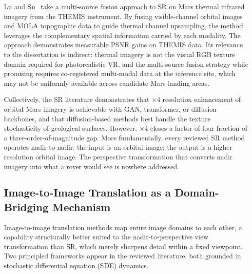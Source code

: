\documentclass[10pt,journal]{IEEEtran}
\begin{document}
Lu and Su~\cite{lu2025thermal} take a multi-source fusion approach to SR on Mars
thermal infrared imagery from the THEMIS instrument. By fusing visible-channel
orbital images and MOLA topographic data to guide thermal channel upsampling,
the method leverages the complementary spatial information carried by each
modality. The approach demonstrates measurable PSNR gains on THEMIS data.
Its relevance to the dissertation is indirect: thermal imagery is not the visual
RGB texture domain required for photorealistic VR, and the multi-source fusion
strategy while promising requires co-registered multi-modal data at the
inference site, which may not be uniformly available across candidate Mars landing
areas.

Collectively, the SR literature demonstrates that $\times$4 resolution enhancement
of orbital Mars imagery is achievable with GAN, transformer, or diffusion
backbones, and that diffusion-based methods best handle the texture stochasticity
of geological surfaces. However, $\times$4 closes a factor-of-four fraction of a
three-order-of-magnitude gap. More fundamentally, every reviewed SR method
operates nadir-to-nadir: the input is an orbital image; the output is a
higher-resolution orbital image. The perspective transformation that converts
nadir imagery into what a rover would see is nowhere addressed.

\subsection{Image-to-Image Translation as a Domain-Bridging Mechanism}
\label{subsec:i2i}

Image-to-image translation methods map entire image domains to each other, a
capability structurally better suited to the nadir-to-perspective view
transformation than SR, which merely sharpens detail within a fixed viewpoint.
Two principled frameworks appear in the reviewed literature, both grounded in
stochastic differential equation (SDE) dynamics.
\end{document}
